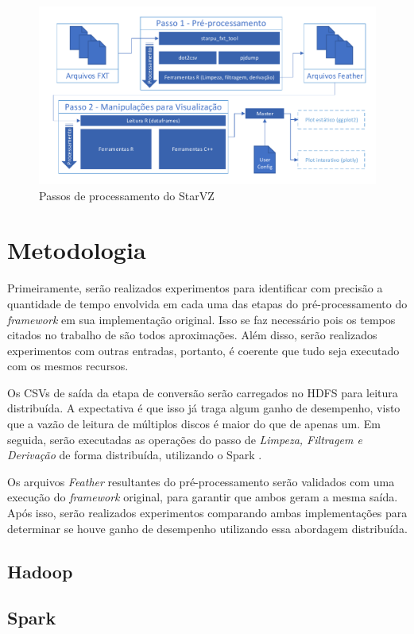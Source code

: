 \documentclass[ppgc,espec]{iiufrgs}
\begin{document}
\begin{figure}[H]
 \centerline{\includegraphics[width=1\textwidth]{./images/all-proc.pdf}}
 \caption{Passos de processamento do StarVZ}
 \label{fig:starvz-steps}
\end{figure}


%
\chapter{Metodologia} \label{lbl:metodologia}

Primeiramente, serão realizados experimentos para identificar com precisão a quantidade de tempo
envolvida em cada uma das etapas do pré-processamento do \emph{framework} em sua implementação original. Isso se faz necessário
pois os tempos citados no trabalho de \citet{ref:starvz} são todos aproximações. Além disso, serão realizados experimentos com 
outras entradas, portanto, é coerente que tudo seja executado com os mesmos recursos.

Os CSVs de saída da etapa de conversão serão carregados no HDFS \cite{ref:hdfs} para leitura distribuída. A expectativa é que isso já traga algum ganho de desempenho, visto que a vazão de leitura de múltiplos discos é maior do que de apenas um. Em seguida, serão executadas as operações do passo de \emph{Limpeza, Filtragem e Derivação} de forma distribuída, utilizando o Spark \cite{ref:spark}.

Os arquivos \emph{Feather} resultantes do pré-processamento serão validados com uma execução do \emph{framework} original, para garantir que ambos geram a mesma saída. Após isso, serão realizados experimentos comparando ambas implementações para determinar se houve ganho de desempenho utilizando essa abordagem distribuída.

\section{Hadoop}

\section{Spark}



\end{document}
